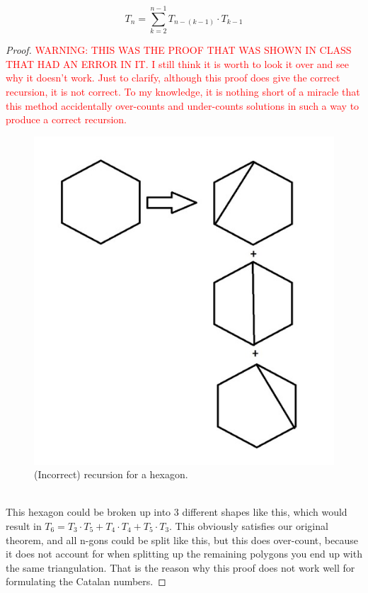 \begin{theorem}
	$$T_n = \sum_{k=2}^{n-1}T_{n-(k-1)}\cdot T_{k-1}$$
\end{theorem}
\begin{proof}
	\textcolor{red}{WARNING: THIS WAS THE PROOF THAT WAS SHOWN IN CLASS THAT HAD AN ERROR IN IT. I still think it is worth to look it over and see why it doesn't work. Just to clarify, although this proof does give the correct recursion, it is not correct. To my knowledge, it is nothing short of a miracle that this method accidentally over-counts and under-counts solutions in such a way to produce a correct recursion.}
	\begin{figure}
        \includegraphics[width=\linewidth]{figures/T6Hexagons.jpg}
        \caption{(Incorrect) recursion for a hexagon.}
        \label{fig:hex1}
    \end{figure}\\
    This hexagon could be broken up into 3 different shapes like this, which would result in $T_6 = T_3\cdot T_5 + T_4\cdot T_4 + T_5\cdot T_3$. This obviously satisfies our original theorem, and all n-gons could be split like this, but this does over-count, because it does not account for when splitting up the remaining polygons you end up with the same triangulation. That is the reason why this proof does not work well for formulating the Catalan numbers.
\end{proof}

